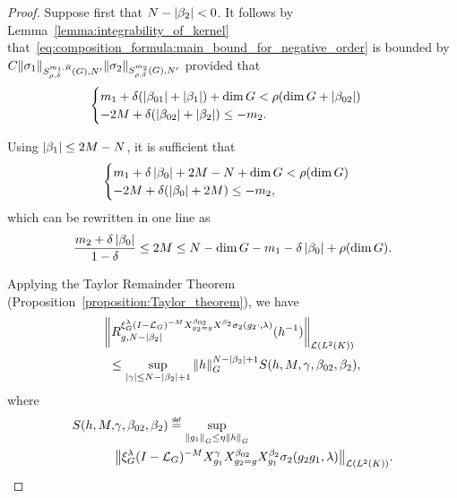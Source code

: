 \begin{proof}
    Suppose first that $N - \abs {\beta_2} < 0$.
    It follows by Lemma~\ref{lemma:integrability_of_kernel}
    that~\eqref{eq:composition_formula:main_bound_for_negative_order} is bounded by $C \SymbolSemiNorm {m_1, R} {\rho, \delta} {N'} {\sigma_1} \SymbolSemiNorm {m_2} {\rho, \delta} {N'} {\sigma_2}$
    provided that
    \begin{align*}
        \begin{cases}
            m_1 + \delta (\abs {\beta_{01}} + \abs {\beta_1}) + \dim \Group < \rho(\dim \Group + \abs {\beta_{02}})\\
            -2 M + \delta(\abs {\beta_{02}} + \abs {\beta_2}) \leq - m_2.
        \end{cases}
    \end{align*}

    Using $\abs {\beta_1} \leq 2M - N$,
    it is sufficient that
    \begin{align*}
        \begin{cases}
            m_1 + \delta \abs {\beta_{0}} + 2 M - N + \dim \Group < \rho(\dim \Group)\\
            -2 M + \delta(\abs {\beta_{0}} + 2 M) \leq - m_2,
        \end{cases}
    \end{align*}
    which can be rewritten in one line as
    \begin{align}
        \frac {m_2 + \delta \abs {\beta_{0}}} {1 - \delta} \leq 2 M
        \leq N - \dim \Group - m_1 - \delta \abs {\beta_0} + \rho (\dim \Group).
        \label{eq:composition_formula:first_condition_on_M}
    \end{align}

    Applying the Taylor Remainder Theorem (Proposition~\ref{proposition:Taylor_theorem}),
    we have
    \begin{align*}
        &\norm [\Lin {\Lebesgue 2 \CompactGroup}] {\TaylorRemainder {\Rep \lambda \BesselPotentialSquared {-M} \LeftDifferentialOperator [g_2 = g] {\beta_{02}} \LeftDifferentialOperator {\beta_2} \sigma_2(g_2 \dummy, \lambda)} g {N - \abs {\beta_2}} (h^{-1})}\\
        &\ \leq
        \sup_{\abs \gamma \leq N - \abs {\beta_2} + 1}
        \norm [\Group] h^{N - \abs {\beta_2} + 1}
        S(h, M, \gamma, \beta_{02}, \beta_2),
    \end{align*}
    where
    \begin{align*}
        S(h, M, &\gamma, \beta_{02}, \beta_2 ) \defeq
        \sup_{\norm [\Group] {g_1} \leq \eta \norm [\Group] h}\\
        &\norm [\Lin {\Lebesgue 2 \CompactGroup}] {%
            \Rep \lambda \BesselPotentialSquared {-M}
            \LeftDifferentialOperator [g_1] {\gamma}
            \LeftDifferentialOperator [g_2 = g] {\beta_{02}}
            \LeftDifferentialOperator [g_1] {\beta_2}
            \sigma_2(g_2 g_1, \lambda)
        }.
    \end{align*}


\end{proof}
